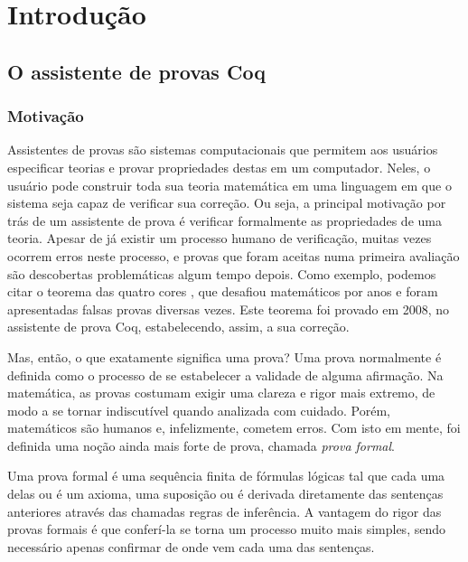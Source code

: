 \chapter{Introdução}

\section{O assistente de provas Coq} 
\subsection{Motivação}

Assistentes de provas são sistemas computacionais que permitem aos usuários
especificar teorias e provar propriedades destas em um computador. Neles, o
usuário pode construir toda sua teoria matemática em uma linguagem em que o
sistema seja capaz de verificar sua correção. Ou seja, a principal motivação por
trás de um assistente de prova é verificar formalmente as propriedades de uma
teoria. Apesar de já existir um processo humano de verificação, muitas vezes
ocorrem erros neste processo, e provas que foram aceitas numa primeira avaliação
são descobertas problemáticas algum tempo depois. Como exemplo, podemos citar o
teorema das quatro cores \cite{four_colour}, que desafiou matemáticos por anos e
foram apresentadas falsas provas diversas vezes. Este teorema foi provado em
2008, no assistente de prova  Coq, estabelecendo, assim, a sua correção.

Mas, então, o que exatamente significa uma prova? Uma prova normalmente é
definida como o processo de se estabelecer a validade de alguma afirmação. Na
matemática, as provas costumam exigir uma clareza e rigor mais extremo, de modo
a se tornar indiscutível quando analizada com cuidado. Porém, matemáticos são
humanos e, infelizmente, cometem erros. Com isto em mente, foi definida uma
noção ainda mais forte de prova, chamada \emph{prova formal}.

Uma prova formal é uma sequência finita de fórmulas lógicas tal que cada uma
delas ou é um axioma, uma suposição ou é derivada diretamente das sentenças
anteriores através das chamadas regras de inferência. A vantagem do rigor das
provas formais é que conferí-la se torna um processo muito mais simples, sendo
necessário apenas confirmar de onde vem cada uma das sentenças.

